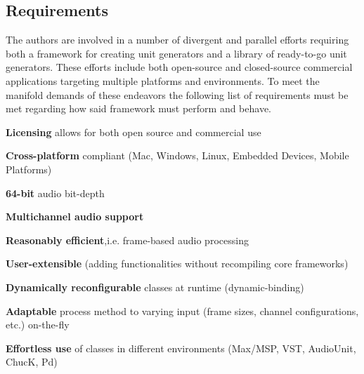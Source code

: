 \documentclass[twoside,10pt]{article}
\newenvironment{packed_item}{
\begin{itemize}
  \setlength{\itemsep}{1pt}
  \setlength{\parskip}{0pt}
  \setlength{\parsep}{0pt}
}{\end{itemize}}
\begin{document}
\subsection{Requirements} \label{sec:Requirements}%

The authors are involved in a number of divergent and parallel efforts requiring both a framework for creating unit generators and a library of ready-to-go unit generators.  These efforts include both open-source and closed-source commercial applications targeting multiple platforms and environments.  To meet the manifold demands of these endeavors the following list of requirements must be met regarding how said framework must perform and behave.


\begin{packed_item}%
  \item \textbf{Licensing} allows for both open source and commercial use
	\item \textbf{Cross-platform} compliant (Mac, Windows, Linux, Embedded Devices, Mobile Platforms)	
	\item \textbf{64-bit} audio bit-depth
	\item \textbf{Multichannel audio support}
	\item \textbf{Reasonably efficient},i.e. frame-based audio processing
	\item \textbf{User-extensible} (adding functionalities without recompiling core frameworks)
	\item \textbf{Dynamically reconfigurable} classes at runtime (dynamic-binding)
	\item \textbf{Adaptable} process method to varying input (frame sizes, channel configurations, etc.) on-the-fly
	\item \textbf{Effortless use} of classes in different environments (Max/MSP, VST, AudioUnit, ChucK, Pd)
\end{packed_item}%

\end{document}
